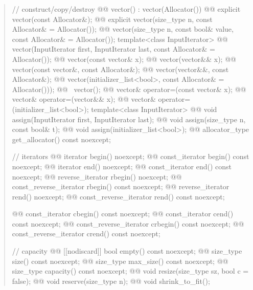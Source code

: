 \documentclass{wg21}
\begin{document}
\begin{quote}
\begin{codeblock}
{{    // construct/copy/destroy
    @@ vector() : vector(Allocator()) { }
    @@ explicit vector(const Allocator&);
    @@ explicit vector(size_type n, const Allocator& = Allocator());
    @@ vector(size_type n, const bool& value, const Allocator& = Allocator());
    template<class InputIterator>
      @@ vector(InputIterator first, InputIterator last, const Allocator& = Allocator());
    @@ vector(const vector& x);
    @@ vector(vector&& x);
    @@ vector(const vector&, const Allocator&);
    @@ vector(vector&&, const Allocator&);
    @@ vector(initializer_list<bool>, const Allocator& = Allocator()));
    @@ ~vector();
    @@ vector& operator=(const vector& x);
    @@ vector& operator=(vector&& x);
    @@ vector& operator=(initializer_list<bool>);
    template<class InputIterator>
      @@ void assign(InputIterator first, InputIterator last);
    @@ void assign(size_type n, const bool& t);
    @@ void assign(initializer_list<bool>);
    @@ allocator_type get_allocator() const noexcept;

    // iterators
    @@ iterator               begin() noexcept;
    @@ const_iterator         begin() const noexcept;
    @@ iterator               end() noexcept;
    @@ const_iterator         end() const noexcept;
    @@ reverse_iterator       rbegin() noexcept;
    @@ const_reverse_iterator rbegin() const noexcept;
    @@ reverse_iterator       rend() noexcept;
    @@ const_reverse_iterator rend() const noexcept;

    @@ const_iterator         cbegin() const noexcept;
    @@ const_iterator         cend() const noexcept;
    @@ const_reverse_iterator crbegin() const noexcept;
    @@ const_reverse_iterator crend() const noexcept;

    // capacity
    @@ [[nodiscard]] bool empty() const noexcept;
    @@ size_type size() const noexcept;
    @@ size_type max_size() const noexcept;
    @@ size_type capacity() const noexcept;
    @@ void      resize(size_type sz, bool c = false);
    @@ void      reserve(size_type n);
    @@ void      shrink_to_fit();

}}
\end{codeblock}
\end{quote}
\end{document}

